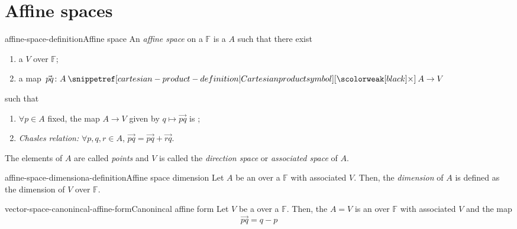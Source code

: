 \documentclass[preview]{standalone}
\begin{document}
\genpage

\section{Affine spaces}


\begin{snippetdefinition}{affine-space-definition}{Affine space}
    An \emph{affine space} on a \field \(\mathbb{F}\) is a \set
    \(A\) such that there exist 
    \begin{enumerate}
        \item a \vectorspace \(V\) over \(\mathbb{F}\);
        \item a map \(\vec{pq}\colon A \cartesianprod A \to V\)
    \end{enumerate}
    such that
    \begin{enumerate}
        \item \(\forall p \in A\) fixed, the map \(A \to V\) given by \(q \mapsto \vec{pq}\) is \bijective;
        \item \emph{Chasles relation:} \(\forall p, q, r \in A\), \(\vec{pq} = \vec{pq} + \vec{rq}\).
    \end{enumerate}
    The elements of \(A\) are called \emph{points} and \(V\) is called the \emph{direction space} or 
    \emph{associated space} of \(A\).
\end{snippetdefinition}

\begin{snippetdefinition}{affine-space-dimensiona-definition}{Affine space dimension}
    Let \(A\) be an \affinespace over a \field \(\mathbb{F}\) with associated \vectorspace \(V\).
    Then, the \emph{dimension} of \(A\) is defined as the dimension of \(V\) over \(\mathbb{F}\).
\end{snippetdefinition}

\begin{snippetproposition}{vector-space-canonincal-affine-form}{Canonincal affine form}
    Let \(V\) be a \vectorspace over a \field \(\mathbb{F}\).
    Then, the \set \(A = V\) is an \affinespace over \(\mathbb{F}\) with associated \vectorspace \(V\) and the map
    \[
        \vec{pq} = q - p
    \]
\end{snippetproposition}
\end{document}
